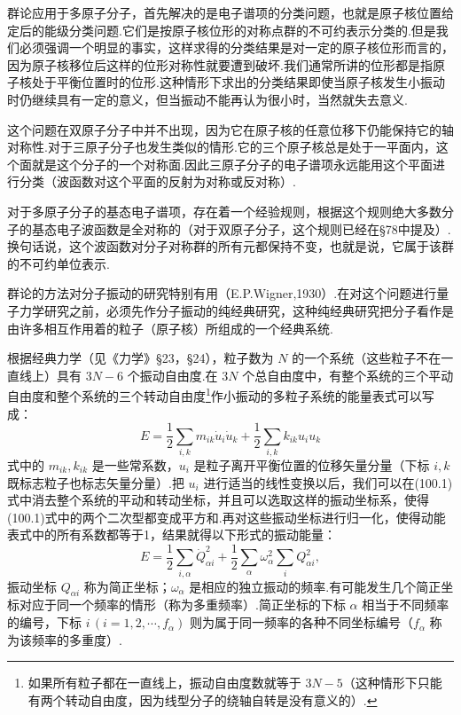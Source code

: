 群论应用于多原子分子，首先解决的是电子谱项的分类问题，也就是原子核位置给定后的能级分类问题.它们是按原子核位形的对称点群的不可约表示分类的.但是我们必须强调一个明显的事实，这样求得的分类结果是对一定的原子核位形而言的，因为原子核移位后这样的位形对称性就要遭到破坏.我们通常所讲的位形都是指原子核处于平衡位置时的位形.这种情形下求出的分类结果即使当原子核发生小振动时仍继续具有一定的意义，但当振动不能再认为很小时，当然就失去意义.

这个问题在双原子分子中并不出现，因为它在原子核的任意位移下仍能保持它的轴对称性.对于三原子分子也发生类似的情形.它的三个原子核总是处于一平面内，这个面就是这个分子的一个对称面.因此三原子分子的电子谱项永远能用这个平面进行分类（波函数对这个平面的反射为对称或反对称）.

对于多原子分子的基态电子谱项，存在着一个经验规则，根据这个规则绝大多数分子的基态电子波函数是全对称的（对于双原子分子，这个规则已经在§78中提及）.换句话说，这个波函数对分子对称群的所有元都保持不变，也就是说，它属于该群的不可约单位表示.

群论的方法对分子振动的研究特别有用（E.P.Wigner,1930）.在对这个问题进行量子力学研究之前，必须先作分子振动的纯经典研究，这种纯经典研究把分子看作是由许多相互作用着的粒子（原子核）所组成的一个经典系统.

根据经典力学（见《力学》§23，§24），粒子数为 $N$ 的一个系统（这些粒子不在一直线上）具有 $3N-6$ 个振动自由度.在 $3N$ 个总自由度中，有整个系统的三个平动自由度和整个系统的三个转动自由度\footnote{如果所有粒子都在一直线上，振动自由度数就等于 $3N-5$（这种情形下只能有两个转动自由度，因为线型分子的绕轴自转是没有意义的）.}作小振动的多粒子系统的能量表式可以写成：
\begin{equation}
  E=\frac{1}{2}\sum_{i,k}m_{ik}\dot{u}_i\dot{u}_k
  +\frac{1}{2}\sum_{i,k}k_{ik}u_iu_k
\end{equation}
式中的 $m_{ik},k_{ik}$ 是一些常系数，$u_i$ 是粒子离开平衡位置的位移矢量分量（下标 $i,k$ 既标志粒子也标志矢量分量）.把 $u_i$ 进行适当的线性变换以后，我们可以在(100.1)式中消去整个系统的平动和转动坐标，并且可以选取这样的振动坐标系，使得(100.1)式中的两个二次型都变成平方和.再对这些振动坐标进行归一化，使得动能表式中的所有系数都等于1，结果就得以下形式的振动能量：
\begin{equation}
  E=\frac{1}{2}\sum_{i,\alpha}\dot{Q}_{\alpha i}^2
  +\frac{1}{2}\sum_{\alpha}\omega_\alpha^2\sum_i Q_{\alpha i}^2,
\end{equation}
振动坐标 $Q_{\alpha i}$ 称为简正坐标；$\omega_\alpha$ 是相应的独立振动的频率.有可能发生几个简正坐标对应于同一个频率的情形（称为多重频率）.简正坐标的下标 $\alpha$ 相当于不同频率的编号，下标 $i\,(i=1,2,\cdots,f_\alpha)$ 则为属于同一频率的各种不同坐标编号（$f_\alpha$ 称为该频率的多重度）.

